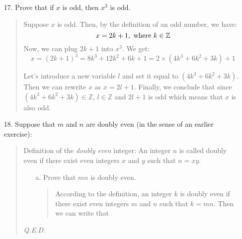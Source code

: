 \documentclass[12pt, a4paper]{article}             %
\begin{document}
\begin{enumerate}
\item[17.]
Prove that if $x$ is odd, then $x^3$ is odd.

\begin{quote}
Suppose $x$ is odd. Then, by the definition of an odd number, we have:
$$x = 2k + 1, \ \textnormal{where} \ k \in \mathbb{Z}$$
Now, we can plug $2k + 1$ into $x^3$. We get:
$$
x = (2k + 1)^3 = 8k^3 + 12k^2 + 6k + 1 = 2 \times (4k^3 + 6k^2 + 3k) + 1
$$

Let's introduce a new variable $l$ and set it equal to $(4k^3 + 6k^2 + 3k)$.
Then we can rewrite $x$ as $x = 2l + 1$. Finally, we conclude that since
$(4k^3 + 6k^2 + 3k) \in \mathbb{Z}$, $l \in \mathbb{Z}$ and $2l + 1$ is odd which
means that $x$ is also odd.
\end{quote}

\item[18.]
Suppose that $m$ and $n$ are doubly even (in the sense of an earlier exercise):
\begin{quote}
Definition of the \textit{doubly even} integer: An integer $n$ is called doubly even if there exist even integers $x$ and $y$ such that $n = xy$.\\

\begin{itemize}
\item[a.]
Prove that $mn$ is doubly even.
\begin{quote}
According to the definition, an integer $k$ is doubly even if there exist even integers $m$ and $n$ such that
$k = mn$. Then we can write that 
\end{quote}
\end{itemize}

\begin{flushright}
\textit{Q.E.D.}
\end{flushright}
\end{quote}

\end{enumerate}
\end{document}
